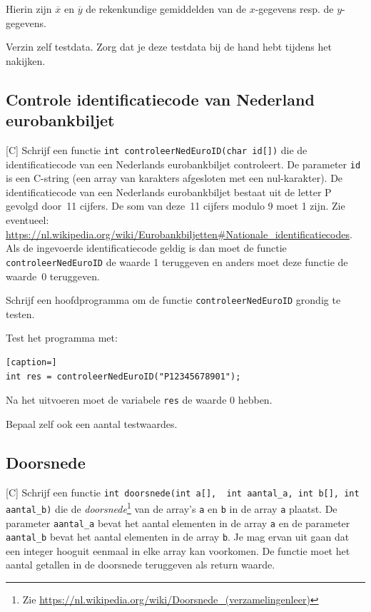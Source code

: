 \documentclass[a4paper,10pt,fleqn,twoside]{article}
\begin{document}
Hierin zijn $\overline{x}$ en $\overline{y}$ de rekenkundige gemiddelden van de $x$-gegevens resp. de $y$-gegevens.

Verzin zelf testdata. Zorg dat je deze testdata bij de hand hebt tijdens het nakijken.

\subsection{Controle identificatiecode van Nederland eurobankbiljet}[C]
Schrijf een functie \lstinline|int controleerNedEuroID(char id[])| die de identificatiecode van een Nederlands eurobankbiljet controleert. De parameter \lstinline|id| is een C-string (een array van karakters afgesloten met een nul-karakter). De identificatiecode van een Nederlands eurobankbiljet bestaat uit de letter P gevolgd door~11 cijfers. De som van deze~11 cijfers modulo 9 moet 1 zijn. Zie eventueel: \url{https://nl.wikipedia.org/wiki/Eurobankbiljetten#Nationale_identificatiecodes}. Als de ingevoerde identificatiecode geldig is dan moet de functie \lstinline|controleerNedEuroID| de waarde 1 teruggeven en anders moet deze functie de waarde~0 teruggeven.

Schrijf een hoofdprogramma om de functie \lstinline|controleerNedEuroID| grondig te testen.

Test het programma met:

\begin{lstlisting}[caption=]
int res = controleerNedEuroID("P12345678901");
\end{lstlisting}

Na het uitvoeren moet de variabele \lstinline|res| de waarde 0 hebben.

Bepaal zelf ook een aantal testwaardes.

\subsection{Doorsnede}[C]
Schrijf een functie \mbox{\lstinline[columns=fixed]|int doorsnede(int a[],  int aantal_a, int b[], int aantal_b)|} die de \textsl{doorsnede}\footnote{Zie \url{https://nl.wikipedia.org/wiki/Doorsnede_(verzamelingenleer)}} van de array’s \lstinline|a| en \lstinline|b| in de array \lstinline|a| plaatst. De parameter \lstinline|aantal_a| bevat het aantal elementen in de array \lstinline|a| en de parameter \lstinline|aantal_b| bevat het aantal elementen in de array \lstinline|b|. Je mag ervan uit gaan dat een integer hooguit eenmaal in elke array kan voorkomen. De functie moet het aantal getallen in de doorsnede teruggeven als return waarde. 
\end{document}
